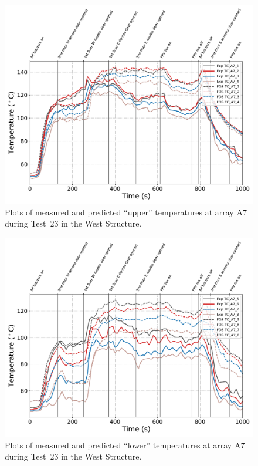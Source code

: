 \begin{figure}[!h]
	\centering
	\includegraphics[width=\columnwidth]{Figures/Plots/Validation/Temperature/Test_23_TC_A7_upper}
	\caption{Plots of measured and predicted ``upper'' temperatures at array A7 during Test~23 in the West Structure.}
	\label{fig:TCA7_upper_data_Test23}
\end{figure}

\begin{figure}[!h]
	\centering
	\includegraphics[width=\columnwidth]{Figures/Plots/Validation/Temperature/Test_23_TC_A7_lower}
	\caption{Plots of measured and predicted ``lower'' temperatures at array A7 during Test~23 in the West Structure.}
	\label{fig:TCA7_lower_data_Test23}
\end{figure}

